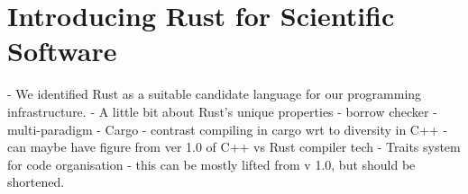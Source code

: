 \section{Introducing Rust for Scientific Software}\label{chpt:1:sec:2}

- We identified Rust as a suitable candidate language for our programming infrastructure.
- A little bit about Rust's unique properties
    - borrow checker
    - multi-paradigm
    - Cargo
        - contrast compiling in cargo wrt to diversity in C++
        - can maybe have figure from ver 1.0 of C++ vs Rust compiler tech
    - Traits system for code organisation
        - this can be mostly lifted from v 1.0, but should be shortened.

